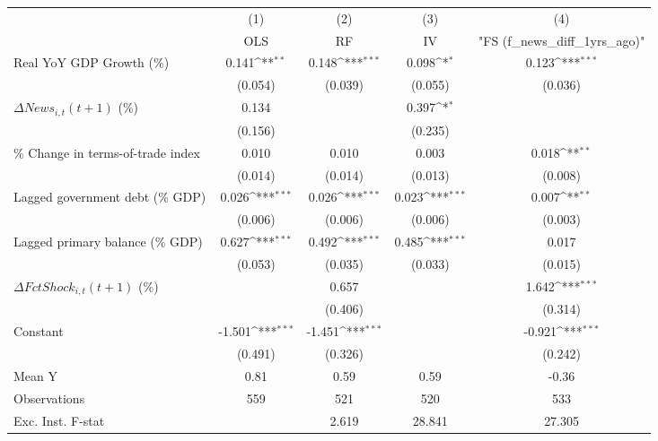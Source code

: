 {
\def\sym#1{\ifmmode^{#1}\else\(^{#1}\)\fi}
\begin{tabular}{l*{4}{c}}
\toprule
                    &\multicolumn{1}{c}{(1)}&\multicolumn{1}{c}{(2)}&\multicolumn{1}{c}{(3)}&\multicolumn{1}{c}{(4)}\\
                    &\multicolumn{1}{c}{OLS}&\multicolumn{1}{c}{RF}&\multicolumn{1}{c}{IV}&\multicolumn{1}{c}{ "FS (f_news_diff_1yrs_ago)" }\\
\midrule
Real YoY GDP Growth (\%)&       0.141\sym{**} &       0.148\sym{***}&       0.098\sym{*}  &       0.123\sym{***}\\
                    &     (0.054)         &     (0.039)         &     (0.055)         &     (0.036)         \\
\addlinespace
$ \Delta News_{i,t}(t+1)$ (\%)&       0.134         &                     &       0.397\sym{*}  &                     \\
                    &     (0.156)         &                     &     (0.235)         &                     \\
\addlinespace
\% Change in terms-of-trade index&       0.010         &       0.010         &       0.003         &       0.018\sym{**} \\
                    &     (0.014)         &     (0.014)         &     (0.013)         &     (0.008)         \\
\addlinespace
Lagged government debt (\% GDP)&       0.026\sym{***}&       0.026\sym{***}&       0.023\sym{***}&       0.007\sym{**} \\
                    &     (0.006)         &     (0.006)         &     (0.006)         &     (0.003)         \\
\addlinespace
Lagged primary balance (\% GDP)&       0.627\sym{***}&       0.492\sym{***}&       0.485\sym{***}&       0.017         \\
                    &     (0.053)         &     (0.035)         &     (0.033)         &     (0.015)         \\
\addlinespace
$ \Delta FctShock_{i,t}(t+1)$ (\%)&                     &       0.657         &                     &       1.642\sym{***}\\
                    &                     &     (0.406)         &                     &     (0.314)         \\
\addlinespace
Constant            &      -1.501\sym{***}&      -1.451\sym{***}&                     &      -0.921\sym{***}\\
                    &     (0.491)         &     (0.326)         &                     &     (0.242)         \\
\midrule
Mean Y              &        0.81         &        0.59         &        0.59         &       -0.36         \\
Observations        &         559         &         521         &         520         &         533         \\
Exc. Inst. F-stat   &                     &       2.619         &      28.841         &      27.305         \\
\bottomrule
\end{tabular}
}
